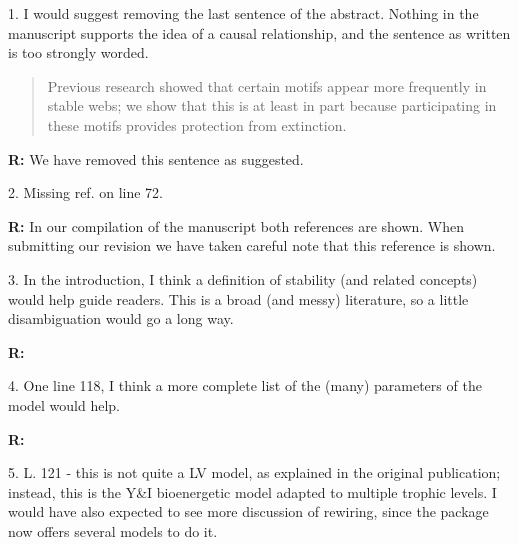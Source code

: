 \documentclass[12pt]{article}
\begin{document}
    1. I would suggest removing the last sentence of the abstract. Nothing in the manuscript supports the idea of a causal relationship, and the sentence as written is too strongly worded.

    \begin{quotation}
      Previous research showed that certain motifs appear more frequently in stable webs; we show that this is at least in part because participating in these motifs provides protection from extinction.
    \end{quotation}

    \smallskip

    \textbf{R:} We have removed this sentence as suggested.

    \smallskip

    2. Missing ref. on line 72.


    \smallskip

    \textbf{R:} In our compilation of the manuscript both references are shown. When submitting our revision we have taken careful note that this reference is shown.

    \smallskip

    3. In the introduction, I think a definition of stability (and related concepts) would help guide readers. This is a broad (and messy) literature, so a little disambiguation would go a long way.

    \smallskip

    \textbf{R:} %

    \smallskip

    4. One line 118, I think a more complete list of the (many) parameters of the model would help.


    \smallskip

    \textbf{R:}

    \smallskip

    5. L. 121 - this is not quite a LV model, as explained in the original publication; instead, this is the Y\&I bioenergetic model adapted to multiple trophic levels. I would have also expected to see more discussion of rewiring, since the package now offers several models to do it.
\end{document}
